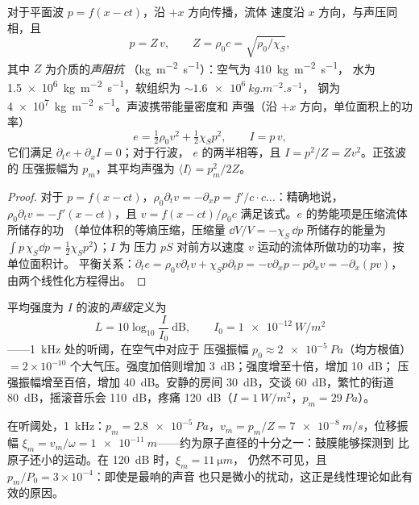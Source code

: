 \begin{proposition}[平面声行波]\label{prop:b2:sound-waves:plane}
对于平面波 $p = f(x - ct)$，沿 $+x$ 方向传播，流体
速度沿 $x$ 方向，与声压同相，且
\[
p = Z\,v , \qquad Z = \rho_0c = \sqrt{\rho_0/\chi_S} ,
\]
其中 $Z$ 为介质的\emph{声阻抗}
（\unit{kg.m^{-2}.s^{-1}}）：空气为 \qty{410}{kg.m^{-2}.s^{-1}}，
水为 \qty{1.5e6}{kg.m^{-2}.s^{-1}}，软组织为 $\sim\qty{1.6e6}{kg.m^{-2}.s^{-1}}$，
钢为 \qty{4e7}{kg.m^{-2}.s^{-1}}。声波携带能量密度和
声强（沿 $+x$ 方向，单位面积上的功率）
\[
e = \tfrac12\rho_0v^2 + \tfrac12\chi_Sp^2 , \qquad I = p\,v ,
\]
它们满足 $\partial_te + \partial_xI = 0$；对于行波，
$e$ 的两半相等，且 $I = p^2/Z = Zv^2$。正弦波的
压强振幅为 $p_m$，其平均声强为 $\langle I\rangle = p_m^2/2Z$。
\end{proposition}

\begin{proof}
对于 $p = f(x - ct)$，$\rho_0\partial_tv = -\partial_xp = f'/c\cdot c\dots$：精确地说，
$\rho_0\partial_tv = -f'(x - ct)$，且 $v = f(x - ct)/\rho_0c$ 满足该式。$e$ 的势能项是压缩流体所储存的功
（单位体积的等熵压缩，压缩量 $\dd V/V = -\chi_S\,\dd p$
所储存的能量为 $\int p\,\chi_S\dd p = \tfrac12\chi_Sp^2$）；$I$ 为
压力 $pS$ 对前方以速度 $v$ 运动的流体所做功的功率，按单位面积计。
平衡关系：$\partial_te = \rho_0v\partial_tv + \chi_Sp\partial_tp = -v\partial_xp - p\partial_xv =
-\partial_x(pv)$，
由两个线性化方程得出。
\end{proof}

\begin{definition}[声级]\label{def:b2:sound-waves:decibel}
平均强度为 $I$ 的波的\emph{声级}定义为
\[
L = 10\log_{10}\frac I{I_0} \ \text{dB} , \qquad I_0 = \qty{1e-12}{W/m^2}
\]
——\qty{1}{kHz} 处的听阈，在空气中对应于
压强振幅 $p_0 \approx \qty{2e-5}{Pa}$（均方根值）$= 2 \times 10^{-10}$
个大气压。强度加倍则增加 \qty{3}{dB}；强度增至十倍，增加 \qty{10}{dB}；
压强振幅增至百倍，增加 \qty{40}{dB}。安静的房间
\qty{30}{dB}，交谈 \qty{60}{dB}，繁忙的街道 \qty{80}{dB}，摇滚音乐会
\qty{110}{dB}，疼痛 \qty{120}{dB}（$I = \qty{1}{W/m^2}$，$p_m = \qty{29}{Pa}$）。
\end{definition}

\begin{example}[声音有多微弱]\label{ex:b2:sound-waves:small}
在听阈处，\qty{1}{kHz}：$p_m = \qty{2.8e-5}{Pa}$，$v_m = p_m/Z =
\qty{7e-8}{m/s}$，位移振幅 $\xi_m = v_m/\omega =
\qty{1e-11}{m}$——约为原子直径的十分之一：鼓膜能够探测到
比原子还小的运动。在 \qty{120}{dB} 时，$\xi_m = \qty{11}{\micro m}$，
仍然不可见，且 $p_m/P_0 = 3 \times 10^{-4}$：即使是最响的声音
也只是微小的扰动，这正是线性理论如此有效的原因。
\end{example}

